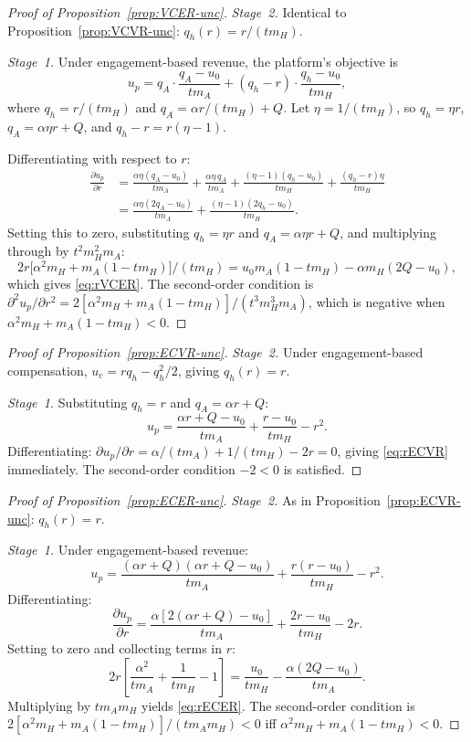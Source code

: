 \documentclass[mnsc,nonblindrev]{informs3_NoOR}
\begin{document}
\begin{proof}[Proof of Proposition~\ref{prop:VCER-unc}]
\textit{Stage~2.} Identical to Proposition~\ref{prop:VCVR-unc}: $q_h(r) = r/(t m_H)$.
 
\textit{Stage~1.} Under engagement-based revenue, the platform's objective is
\[
u_p = q_A \cdot \frac{q_A - u_0}{t m_A} + (q_h - r)\cdot\frac{q_h - u_0}{t m_H},
\]
where $q_h = r/(t m_H)$ and $q_A = \alpha r/(t m_H) + Q$. Let $\eta = 1/(t m_H)$, so $q_h = \eta r$, $q_A = \alpha\eta r + Q$, and $q_h - r = r(\eta - 1)$.
 
Differentiating with respect to $r$:
\begin{align*}
\frac{\partial u_p}{\partial r} &= \frac{\alpha\eta(q_A - u_0)}{t m_A} + \frac{\alpha\eta\, q_A}{t m_A} + \frac{(\eta - 1)(q_h - u_0)}{t m_H} + \frac{(q_h - r)\eta}{t m_H} \\
&= \frac{\alpha\eta(2q_A - u_0)}{t m_A} + \frac{(\eta - 1)(2q_h - u_0)}{t m_H}.
\end{align*}
Setting this to zero, substituting $q_h = \eta r$ and $q_A = \alpha\eta r + Q$, and multiplying through by $t^2 m_H^2 m_A$:
\[
2r\bigl[\alpha^2 m_H +  m_A(1 - t m_H)\bigr]/(t m_H) = u_0 m_A(1 - t m_H) - \alpha m_H(2Q - u_0),
\]
which gives \eqref{eq:rVCER}. The second-order condition is
$\partial^2 u_p/\partial r^2 = 2[\alpha^2 m_H +  m_A(1 - t m_H)]/(t^3 m_H^3 m_A)$,
which is negative when $\alpha^2 m_H +  m_A(1 - t m_H) < 0$.
\end{proof}
 
\begin{proof}[Proof of Proposition~\ref{prop:ECVR-unc}]
\textit{Stage~2.} Under engagement-based compensation, $u_c = rq_h - q_h^2/2$, giving $q_h(r) = r$.
 
\textit{Stage~1.} Substituting $q_h = r$ and $q_A = \alpha r + Q$:
\[
u_p = \frac{\alpha r + Q - u_0}{t m_A} + \frac{r - u_0}{t m_H} - r^2.
\]
Differentiating:
$\partial u_p/\partial r = \alpha/(t m_A) + 1/(t m_H) - 2r = 0$,
giving \eqref{eq:rECVR} immediately.
The second-order condition $-2 < 0$ is satisfied.
\end{proof}
 
\begin{proof}[Proof of Proposition~\ref{prop:ECER-unc}]
\textit{Stage~2.} As in Proposition~\ref{prop:ECVR-unc}: $q_h(r) = r$.
 
\textit{Stage~1.} Under engagement-based revenue:
\[
u_p = \frac{(\alpha r + Q)(\alpha r + Q - u_0)}{t m_A} + \frac{r(r - u_0)}{t m_H} - r^2.
\]
Differentiating:
\[
\frac{\partial u_p}{\partial r} = \frac{\alpha[2(\alpha r + Q) - u_0]}{t m_A} + \frac{2r - u_0}{t m_H} - 2r.
\]
Setting to zero and collecting terms in $r$:
\[
2r\!\left[\frac{\alpha^2}{t m_A} + \frac{1}{t m_H} - 1\right] = \frac{u_0}{t m_H} - \frac{\alpha(2Q - u_0)}{t m_A}.
\]
Multiplying by $t m_A m_H$ yields \eqref{eq:rECER}.
The second-order condition is $2[\alpha^2 m_H +  m_A(1 - t m_H)]/(t m_A m_H) < 0$ iff $\alpha^2 m_H +  m_A(1 - t m_H) < 0$.
\end{proof}
 
\end{document}
